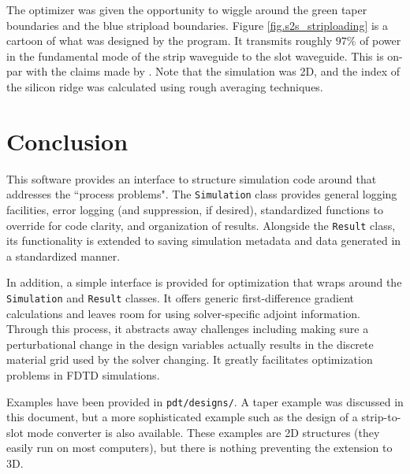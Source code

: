 \documentclass[12pt]{article}
\begin{document}
The optimizer was given the opportunity to wiggle around the green taper boundaries and the blue stripload boundaries. Figure \ref{fig.s2s_striploading} is a cartoon of what was designed by the program. It transmits roughly $97\%$ of power in the fundamental mode of the strip waveguide to the slot waveguide. This is on-par with the claims made by \cite{deng}. Note that the simulation was 2D, and the index of the silicon ridge was calculated using rough averaging techniques. 

\section{Conclusion}
This software provides an interface to structure simulation code around that addresses the ``process problems". The \texttt{Simulation} class provides general logging facilities, error logging (and suppression, if desired), standardized functions to override for code clarity, and organization of results. Alongside the \texttt{Result} class, its functionality is extended to saving simulation metadata and data generated in a standardized manner. 

In addition, a simple interface is provided for optimization that wraps around the \texttt{Simulation} and \texttt{Result} classes. It offers generic first-difference gradient calculations and leaves room for using solver-specific adjoint information. Through this process, it abstracts away challenges including making sure a perturbational change in the design variables actually results in the discrete material grid used by the solver changing. It greatly facilitates optimization problems in FDTD simulations.

Examples have been provided in \texttt{pdt/designs/}. A taper example was discussed in this document, but a more sophisticated example such as the design of a strip-to-slot mode converter \cite{deng} is also available. These examples are 2D structures (they easily run on most computers), but there is nothing preventing the extension to 3D.

\newpage


\end{document}
